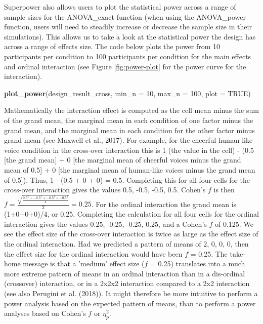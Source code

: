 \documentclass[
  ,jou,floatsintext]{apa6}
\newenvironment{Shaded}{\begin{snugshade}}{\end{snugshade}}
\newcommand{\DataTypeTok}[1]{\textcolor[rgb]{0.13,0.29,0.53}{#1}}
\newcommand{\DecValTok}[1]{\textcolor[rgb]{0.00,0.00,0.81}{#1}}
\newcommand{\KeywordTok}[1]{\textcolor[rgb]{0.13,0.29,0.53}{\textbf{#1}}}
\newcommand{\NormalTok}[1]{#1}
\newcommand{\OtherTok}[1]{\textcolor[rgb]{0.56,0.35,0.01}{#1}}
\begin{document}
Superpower also allows users to plot the statistical power across a range of sample sizes for the ANOVA\_exact function (when using the ANOVA\_power function, users will need to steadily increase or decrease the sample size in their simulations).
This allows us to take a look at the statistical power the design has across a range of effects size.
The code below plots the power from 10 participants per condition to 100 participants per condition for the main effects and ordinal interaction (see Figure \ref{fig:power-plot} for the power curve for the interaction).

\begin{Shaded}
\begin{Highlighting}[]
\KeywordTok{plot_power}\NormalTok{(design_result_cross, }
    \DataTypeTok{min_n =} \DecValTok{10}\NormalTok{, }\DataTypeTok{max_n =} \DecValTok{100}\NormalTok{, }\DataTypeTok{plot =} \OtherTok{TRUE}\NormalTok{)}
\end{Highlighting}
\end{Shaded}

\begin{tcolorbox}[colback=black!5!white,colframe=white!5!black,title=Box 3. Calculating effect sizes for interactions]
Mathematically the interaction effect is computed as the cell mean minus the sum of the grand mean, the marginal mean in each condition of one factor minus the grand mean, and the marginal mean in each condition for the other factor minus grand mean (see Maxwell et al., 2017). For example, for the cheerful human-like voice condition in the cross-over interaction this is 1 (the value in the cell) - (0.5 [the grand mean] + 0 [the marginal mean of cheerful voices minus the grand mean of 0.5] + 0 [the marginal mean of human-like voices minus the grand mean of 0.5]). 
Thus, 1 - (0.5 + 0 + 0) = 0.5.
Completing this for all four cells for the cross-over interaction gives the values 0.5, -0.5, -0.5, 0.5.
Cohen's $f$ is then $f = \frac { \sqrt { \frac { 0.5^2 +-0.5^2 + -0.5^2 + -0.5^2 } { 4 } }}{ 2 } = 0.25$.
For the ordinal interaction the grand mean is (1+0+0+0)/4, or 0.25.
Completing the calculation for all four cells for the ordinal interaction gives the values 0.25, -0.25, -0.25, 0.25, and a Cohen's $f$ of 0.125. 
We see the effect size of the cross-over interaction is twice as large as the effect size of the ordinal interaction. 
Had we predicted a pattern of means of 2, 0, 0, 0, then the effect size for the ordinal interaction would have been $f$ = 0.25. 
The take-home message is that a 'medium' effect size ($f$ = 0.25) translates into a much more extreme pattern of means in an ordinal interaction than in a dis-ordinal (crossover) interaction, or in a 2x2x2 interaction compared to a 2x2 interaction (see also Perugini et al. (2018)).
It might therefore be more intuitive to perform a power analysis based on the expected pattern of means, than to perform a power analyses based on Cohen's $f$ or $\eta_p^2$.
\end{tcolorbox}
\end{document}
